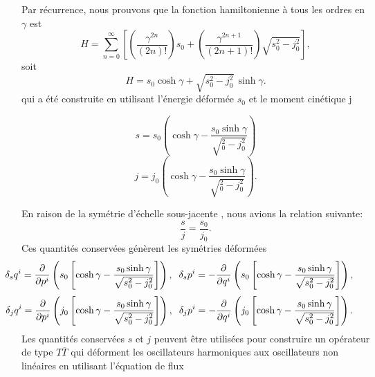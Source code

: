 \documentclass[12pt,a4paper, openany]{report}
\begin{document}
	Par récurrence, nous prouvons que la fonction hamiltonienne à tous les ordres en $\gamma$ est 
	\begin{equation}
		H=\sum_{n=0}^{\infty}\left[\left(\frac{\gamma^{2n}}{(2n)!}\right)s_0+\left(\frac{\gamma^{2n+1	}}{(2n+1)!}\right)\sqrt{s^2_0-j_0^2}\right] ,
	\end{equation}
	soit
	\begin{equation}
		H=s_0\cosh{\gamma}+\sqrt{s^2_0-j_0^2}\,\sinh{\gamma}.
	\end{equation} qui a été construite en utilisant l'énergie déformée $s_0$ et le moment cinétique j 
	\begin{center}
		\begin{equation}
			s=s_0\left(\cosh{\gamma}-\frac{s_0\sinh{\gamma}}{\sqrt{^2_0-j_0^2}}\right)
		\end{equation}
		\begin{equation}
			j=j_0\left(\cosh{\gamma}-\frac{s_0\sinh{\gamma}}{\sqrt{^2_0-j_0^2}}\right).
		\end{equation}
	\end{center} En raison de la symétrie d'échelle sous-jacente , nous avions la relation suivante:
	\begin{equation}
		\frac{s}{j}=\frac{s_0}{j_0} .
	\end{equation} Ces quantités conservées génèrent les symétries déformées 
	\begin{equation}
		\hspace{-1.2cm}\delta_{s}q^i=\frac{\partial}{\partial p^i}\left(s_0\left[\cosh{\gamma}-\frac{s_0\sinh{\gamma}}{\sqrt{s^2_0-j_0^2}}\right]
		\right),\hspace{0.2cm}\delta_{s}p^i=-\frac{\partial}{\partial q^i}\left(s_0\left[\cosh{\gamma}-\frac{s_0\sinh{\gamma}}{\sqrt{s^2_0-j_0^2}}\right]\right),
	\end{equation}
	\begin{equation}
		\hspace{-1.2cm}\delta_{j}q^i=\frac{\partial}{\partial p^i}\left(j_0\left[\cosh{\gamma}-\frac{s_0\sinh{\gamma}}{\sqrt{s^2_0-j_0^2}}\right]\right),\hspace{0.2cm}\delta_{j}p^i=-\frac{\partial}{\partial q^i}\left(j_0\left[\cosh{\gamma}-\frac{s_0\sinh{\gamma}}{\sqrt{s^2_0-j_0^2}}\right]\right).
	\end{equation} Les quantités conservées $s$ et $j$ peuvent \^{e}tre utilisées pour construire un opérateur de type $T\overline{T}$ qui déforment les oscillateurs harmoniques aux oscillateurs non linéaires en utilisant l'équation de flux 
\end{document}
